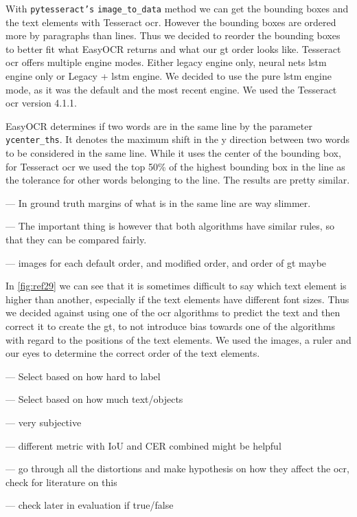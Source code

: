 With \texttt{pytesseract's} \texttt{image\_to\_data} method we can get the bounding boxes and the text elements with Tesseract \gls{ocr}.
However the bounding boxes are ordered more by paragraphs than lines.
Thus we decided to reorder the bounding boxes to better fit what EasyOCR returns and what our \gls{gt} order looks like.
Tesseract \gls{ocr} offers multiple engine modes.
Either legacy engine only, neural nets \gls{lstm} engine only or Legacy + \gls{lstm} engine.
We decided to use the pure \gls{lstm} engine mode, as it was the default and the most recent engine.
We used the Tesseract \gls{ocr} version 4.1.1.


EasyOCR determines if two words are in the same line by the parameter \texttt{ycenter\_ths}.
It denotes the maximum shift in the y direction between two words to be considered in the same line.
While it uses the center of the bounding box, for Tesseract \gls{ocr} we used the top 50\% of the highest bounding box in the line as the tolerance for other words belonging to the line.
The results are pretty similar.

--- In ground truth margins of what is in the same line are way slimmer.

--- The important thing is however that both algorithms have similar rules, so that they can be compared fairly.

--- images for each default order, and modified order, and order of gt maybe


In \autoref{fig:ref29} we can see that it is sometimes difficult to say which text element is higher than another, especially if the text elements have different font sizes.
Thus we decided against using one of the \gls{ocr} algorithms to predict the text and then correct it to create the \gls{gt}, to not introduce bias towards one of the algorithms with regard to the positions of the text elements.
We used the images, a ruler and our eyes to determine the correct order of the text elements.

--- Select based on how hard to label

--- Select based on how much text/objects

--- very subjective

--- different metric with IoU and CER combined might be helpful

--- go through all the distortions and make hypothesis on how they affect the ocr, check for literature on this

--- check later in evaluation if true/false

